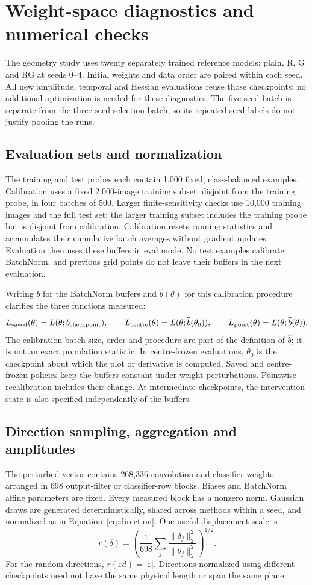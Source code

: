 \FloatBarrier
\section{Weight-space diagnostics and numerical checks}
\label{app:landscape}
The geometry study uses twenty separately trained reference models: plain, R, G and RG at seeds 0--4. Initial weights and data order are paired within each seed. All new amplitude, temporal and Hessian evaluations reuse those checkpoints; no additional optimization is needed for these diagnostics. The five-seed batch is separate from the three-seed selection batch, so its repeated seed labels do not justify pooling the runs.


\subsection{Evaluation sets and normalization}
The training and test probes each contain 1,000 fixed, class-balanced examples. Calibration uses a fixed 2,000-image training subset, disjoint from the training probe, in four batches of 500. Larger finite-sensitivity checks use 10,000 training images and the full test set; the larger training subset includes the training probe but is disjoint from calibration. Calibration resets running statistics and accumulates their cumulative batch averages without gradient updates. Evaluation then uses these buffers in eval mode. No test examples calibrate BatchNorm, and previous grid points do not leave their buffers in the next evaluation.

Writing $b$ for the BatchNorm buffers and $\widehat b(\theta)$ for this calibration procedure clarifies the three functions measured:
\[
 L_{\rm saved}(\theta)=L(\theta;b_{\rm checkpoint}),\qquad
 L_{\rm centre}(\theta)=L(\theta;\widehat b(\theta_0)),\qquad
 L_{\rm point}(\theta)=L(\theta;\widehat b(\theta)).
\]
The calibration batch size, order and procedure are part of the definition of $\widehat b$; it is not an exact population statistic. In centre-frozen evaluations, $\theta_0$ is the checkpoint about which the plot or derivative is computed. Saved and centre-frozen policies keep the buffers constant under weight perturbations. Pointwise recalibration includes their change. At intermediate checkpoints, the intervention state is also specified independently of the buffers.

\subsection{Direction sampling, aggregation and amplitudes}
The perturbed vector contains 268,336 convolution and classifier weights, arranged in 698 output-filter or classifier-row blocks. Biases and BatchNorm affine parameters are fixed. Every measured block has a nonzero norm. Gaussian draws are generated deterministically, shared across methods within a seed, and normalized as in Equation~\eqref{eq:direction}. One useful displacement scale is
\[
 r(\delta)=\left(\frac1{698}\sum_j\frac{\|\delta_j\|_2^2}{\|\theta_j\|_2^2}\right)^{1/2}.
\]
For the random directions, $r(\varepsilon d)=|\varepsilon|$. Directions normalized using different checkpoints need not have the same physical length or span the same plane.

